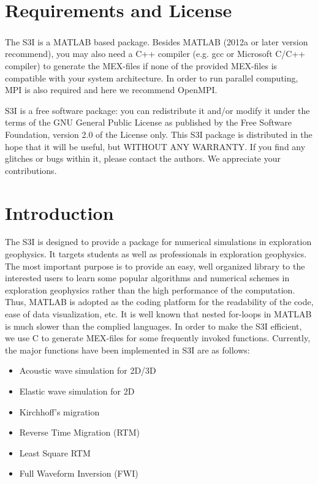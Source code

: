 \documentclass[11pt,titlepage]{article}
\theoremstyle{plain}
\theoremstyle{definition}
\theoremstyle{remark}
\numberwithin{equation}{section}
\begin{document}

\tableofcontents
\newpage



\section{Requirements and License}
The S3I is a MATLAB\textsuperscript{\textregistered} based package. Besides MATLAB (2012a or later version recommend), you may also need a C++ compiler (e.g. gcc or Microsoft C/C++ compiler) to generate the MEX-files if none of the provided MEX-files is compatible with your system architecture. In order to run parallel computing, MPI is also required and here we recommend OpenMPI.

S3I is a free software package: you can redistribute it and/or modify it under the terms of the GNU General Public License as published by the Free Software Foundation, version 2.0 of the License only. This S3I package is distributed in the hope that it will be useful, but WITHOUT ANY WARRANTY. If you find any glitches or bugs within it, please contact the authors. We appreciate your contributions. 



\section{Introduction}
The S3I is designed to provide a package for numerical simulations in exploration geophysics. It targets students as well as professionals in exploration geophysics. The most important purpose is to provide an easy, well organized library to the interested users to learn some popular algorithms and numerical schemes in exploration geophysics rather than the high performance of the computation. Thus, MATLAB is adopted as the coding platform for the readability of the code, ease of data visualization, etc. It is well known that nested for-loops in MATLAB is much slower than the complied languages. In order to make the S3I efficient, we use C to generate MEX-files for some frequently invoked functions. Currently, the major functions have been implemented in S3I are as follows:
\begin{itemize}
\item Acoustic wave simulation for 2D/3D
\item Elastic wave simulation for 2D
\item Kirchhoff's migration
\item Reverse Time Migration (RTM)
\item Least Square RTM
\item Full Waveform Inversion (FWI)
\end{itemize}
\end{document}
